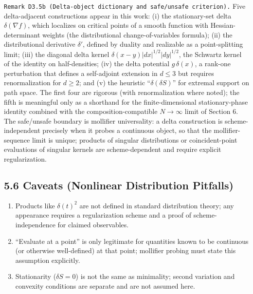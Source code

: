 \documentclass[
]{article}
\providecommand{\tightlist}{%
  \setlength{\itemsep}{0pt}\setlength{\parskip}{0pt}}
\begin{document}
\texttt{Remark\ D3.5b\ (Delta-object\ dictionary\ and\ safe/unsafe\ criterion).}
Five delta-adjacent constructions appear in this work: (i) the
stationary-set delta \(\delta(\nabla f)\), which localizes on critical
points of a smooth function with Hessian-determinant weights (the
distributional change-of-variables formula); (ii) the distributional
derivative \(\delta'\), defined by duality and realizable as a
point-splitting limit; (iii) the diagonal delta kernel
\(\delta(x-y)|dx|^{1/2}|dy|^{1/2}\), the Schwartz kernel of the identity
on half-densities; (iv) the delta potential \(g\,\delta(x)\), a rank-one
perturbation that defines a self-adjoint extension in \(d\le3\) but
requires renormalization for \(d\ge2\); and (v) the heuristic
``\(\delta(\delta S)\)'' for extremal support on path space. The first
four are rigorous (with renormalization where noted); the fifth is
meaningful only as a shorthand for the finite-dimensional
stationary-phase identity combined with the composition-compatible
\(N\to\infty\) limit of Section 6. The safe/unsafe boundary is mollifier
universality: a delta construction is scheme-independent precisely when
it probes a continuous object, so that the mollifier-sequence limit is
unique; products of singular distributions or coincident-point
evaluations of singular kernels are scheme-dependent and require
explicit regularization.

\hypertarget{caveats-nonlinear-distribution-pitfalls}{%
\subsection{5.6 Caveats (Nonlinear Distribution
Pitfalls)}\label{caveats-nonlinear-distribution-pitfalls}}

\begin{enumerate}
\def\labelenumi{\arabic{enumi}.}
\tightlist
\item
  Products like \(\delta(t)^2\) are not defined in standard distribution
  theory; any appearance requires a regularization scheme and a proof of
  scheme-independence for claimed observables.
\item
  ``Evaluate at a point'' is only legitimate for quantities known to be
  continuous (or otherwise well-defined) at that point; mollifier
  probing must state this assumption explicitly.
\item
  Stationarity (\(\delta S=0\)) is not the same as minimality; second
  variation and convexity conditions are separate and are not assumed
  here.
\end{enumerate}
\end{document}
